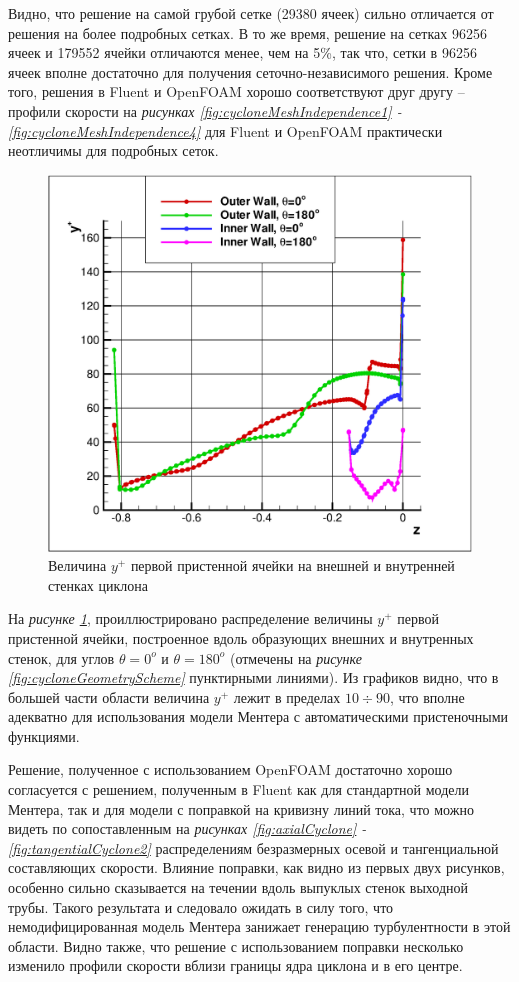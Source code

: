 \clearpage
Видно, что решение на самой грубой сетке (29380 ячеек) сильно отличается от решения на более подробных сетках. В то же время, решение на сетках 96256 ячеек и 179552 ячейки отличаются менее, чем на 5\%, так что, сетки в 96256 ячеек вполне достаточно для получения сеточно-независимого решения. Кроме того, решения в Fluent и OpenFOAM хорошо соответствуют друг другу -- профили скорости на \textit{рисунках \ref{fig:cycloneMeshIndependence1} -  \ref{fig:cycloneMeshIndependence4}} для Fluent и OpenFOAM практически неотличимы для подробных сеток.

\begin{figure}[h]
	\centering
	\includegraphics[scale=0.4]{yplusCyclone}
	\caption{Величина $y^{+}$ первой пристенной ячейки на внешней и внутренней стенках циклона}
	\label{fig:cycloneyPlus}
\end{figure}

На \textit{рисунке \ref{fig:cycloneyPlus}}, проиллюстрировано распределение величины $y^{+}$ первой пристенной ячейки, построенное вдоль образующих внешних и внутренных стенок, для углов $\theta=0^o$ и $\theta=180^o$ (отмечены на \textit{рисунке \ref{fig:cycloneGeometryScheme}} пунктирными линиями). Из графиков видно, что в большей части области величина $y^{+}$ лежит в пределах $10 \div 90$, что вполне адекватно для использования модели Ментера с автоматическими пристеночными функциями.

Решение, полученное с использованием OpenFOAM достаточно хорошо согласуется с решением, полученным в Fluent как для стандартной модели Ментера, так и для модели с поправкой на кривизну линий тока, что можно видеть по сопоставленным на \textit{рисунках \ref{fig:axialCyclone} - \ref{fig:tangentialCyclone2}} распределениям безразмерных осевой и тангенциальной составляющих скорости. Влияние поправки, как видно из первых двух рисунков, особенно сильно сказывается на течении вдоль выпуклых стенок выходной трубы. Такого результата и следовало ожидать в силу того, что немодифицированная модель Ментера занижает генерацию турбулентности в этой области. Видно также, что решение с использованием поправки несколько изменило профили скорости вблизи границы ядра циклона и в его центре.


